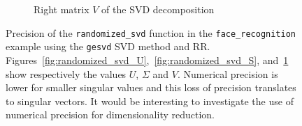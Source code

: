 \documentclass[11pt]{article}
\begin{document}
\begin{figure}
\begin{subfigure}{0.3\linewidth}
    \caption{Right matrix $V$ of the SVD decomposition}
    \label{fig:randomized_svd_V}
    \end{subfigure}
    \caption{Precision of the \texttt{randomized\_svd} function in the 
    \texttt{face\_recognition} example using the \texttt{gesvd} SVD method and RR.
    Figures~\ref{fig:randomized_svd_U},~\ref{fig:randomized_svd_S}, and~\ref{fig:randomized_svd_V}
    show respectively the values $U$, $\Sigma$ and $V$.
     Numerical precision is lower for smaller singular values and this loss of precision translates to singular vectors. It would be interesting to investigate the use of numerical precision for dimensionality reduction.
    }
    \label{fig:face_recognition_svd}
\end{figure}








\end{document}
